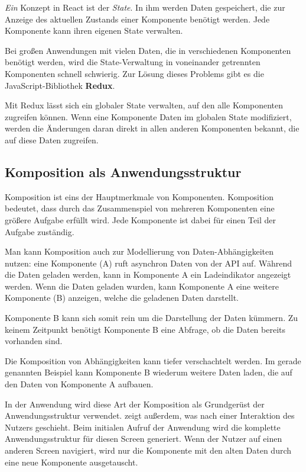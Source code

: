 \emph{Ein} Konzept in React ist der \emph{State}. In ihm werden Daten gespeichert, die zur Anzeige des aktuellen Zustands einer Komponente benötigt werden. Jede Komponente kann ihren eigenen State verwalten. \citep[State and Lifecycle]{ReactDocs}

Bei großen Anwendungen mit vielen Daten, die in verschiedenen Komponenten benötigt werden, wird die State-Verwaltung in voneinander getrennten Komponenten schnell schwierig. Zur Lösung dieses Problems gibt es die JavaScript-Bibliothek \textbf{Redux}.

Mit Redux lässt sich ein globaler State verwalten, auf den alle Komponenten zugreifen können. Wenn eine Komponente Daten im globalen State modifiziert, werden die Änderungen daran direkt in allen anderen Komponenten bekannt, die auf diese Daten zugreifen.

\subsection{Komposition als An\-wen\-dungs\-struk\-tur}
\label{subsec:komposition}

Komposition ist eins der Hauptmerkmale von Komponenten. Komposition bedeutet, dass durch das Zusammenspiel von mehreren Komponenten eine größere Aufgabe erfüllt wird. Jede Komponente ist dabei für einen Teil der Aufgabe zuständig. \citep[Kapitel 1]{Maemecke2017}

Man kann Komposition auch zur Modellierung von Daten-Abhängigkeiten nutzen: eine Komponente (A) ruft asynchron Daten von der \ac{API} auf. Während die Daten geladen werden, kann in Komponente A ein Ladeindikator angezeigt werden. Wenn die Daten geladen wurden, kann Komponente A eine weitere Komponente (B) anzeigen, welche die geladenen Daten darstellt.

Komponente B kann sich somit rein um die Darstellung der Daten kümmern. Zu keinem Zeitpunkt benötigt Komponente B eine Abfrage, ob die Daten bereits vorhanden sind.

Die Komposition von Abhängigkeiten kann tiefer verschachtelt werden. Im gerade genannten Beispiel kann Komponente B wiederum weitere Daten laden, die auf den Daten von Komponente A aufbauen.

In der Anwendung wird diese Art der Komposition als Grundgerüst der Anwendungsstruktur verwendet.  zeigt außerdem, was nach einer Interaktion des Nutzers geschieht. Beim initialen Aufruf der Anwendung wird die komplette Anwendungsstruktur für diesen Screen generiert. Wenn der Nutzer auf einen anderen Screen navigiert, wird nur die Komponente mit den alten Daten durch eine neue Komponente ausgetauscht.

